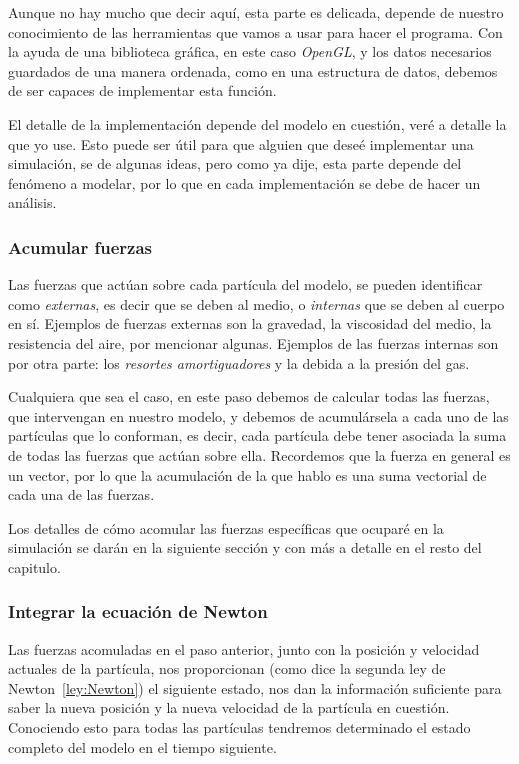 Aunque no hay mucho que decir aquí, esta parte es delicada, depende de nuestro conocimiento de las herramientas que vamos a usar para hacer el programa.
Con la ayuda de una biblioteca gráfica, en este caso \emph{\foreignlanguage{english}{OpenGL}}, y los datos necesarios guardados de una manera ordenada, como en una estructura de datos, debemos de ser capaces de implementar esta función.

El detalle de la implementación depende del modelo en cuestión, veré a detalle la que yo use.
Esto puede ser útil para que alguien que deseé implementar una simulación, se de algunas ideas, pero como ya dije, esta parte depende del fenómeno a modelar, por lo que en cada implementación se debe de hacer un análisis.

\subsubsection{Acumular fuerzas}
Las fuerzas que actúan sobre cada partícula del modelo, se pueden identificar como \emph{externas}, es decir que se deben al medio, o \emph{internas} que se deben al cuerpo en sí.
Ejemplos de fuerzas externas son la gravedad, la viscosidad del medio, la resistencia del aire, por mencionar algunas.
Ejemplos de las fuerzas internas son por otra parte: los \emph{resortes amortiguadores} y la debida a la presión del gas.

Cualquiera que sea el caso, en este paso debemos de calcular todas las fuerzas, que intervengan en nuestro modelo, y debemos de acumulársela a cada uno de las partículas que lo conforman, es decir, cada partícula debe tener asociada la suma de todas las fuerzas que actúan sobre ella.
Recordemos que la fuerza en general es un vector, por lo que la acumulación de la que hablo es una suma vectorial de cada una de las fuerzas.

Los detalles de cómo acomular las fuerzas específicas que ocuparé en la simulación se darán en la siguiente sección y con más a detalle en el resto del capitulo.

\subsubsection{Integrar la ecuación de Newton}
Las fuerzas acomuladas en el paso anterior, junto con la posición y velocidad actuales de la partícula, nos proporcionan (como dice la segunda ley de Newton~\eqref{ley:Newton}) el siguiente estado, nos dan la información suficiente para saber la nueva posición y la nueva velocidad de la partícula en cuestión. 
Conociendo esto para todas las partículas tendremos determinado el estado completo del modelo en el tiempo siguiente.


